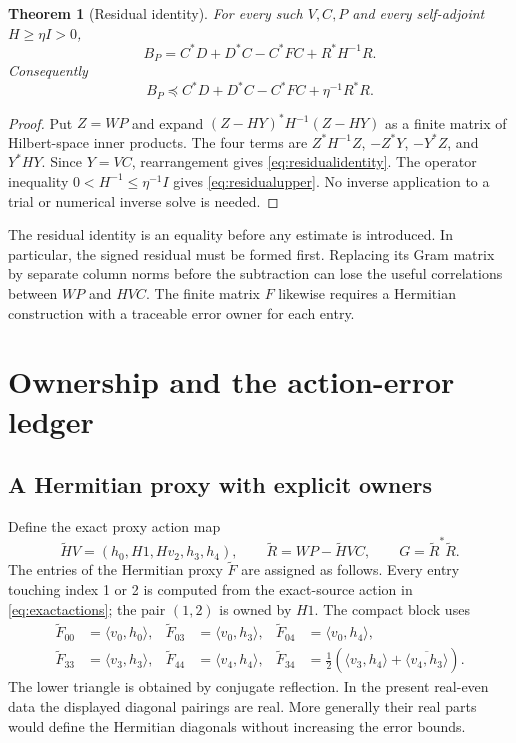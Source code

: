 \documentclass[11pt,a4paper]{article}
\numberwithin{equation}{section}
\newtheorem{theorem}{Theorem}[section]
\theoremstyle{definition}\newtheorem{definition}[theorem]{Definition}
\theoremstyle{remark}\newtheorem{remark}[theorem]{Remark}
\newcommand{\ip}[2]{\langle #1,#2\rangle}
\begin{document}
\begin{theorem}[Residual identity]\label{thm:residual}
For every such $V,C,P$ and every self-adjoint $H\ge\eta I>0$,
\begin{equation}\label{eq:residualidentity}
 B_P=C^*D+D^*C-C^*FC+R^*H^{-1}R.
\end{equation}
Consequently
\begin{equation}\label{eq:residualupper}
 B_P\preceq C^*D+D^*C-C^*FC+\eta^{-1}R^*R.
\end{equation}
\end{theorem}
\begin{proof}
Put $Z=WP$ and expand $(Z-HY)^*H^{-1}(Z-HY)$ as a finite matrix of Hilbert-space inner products. The four terms are $Z^*H^{-1}Z$, $-Z^*Y$, $-Y^*Z$, and $Y^*HY$. Since $Y=VC$, rearrangement gives \eqref{eq:residualidentity}. The operator inequality $0<H^{-1}\le\eta^{-1}I$ gives \eqref{eq:residualupper}. No inverse application to a trial or numerical inverse solve is needed.
\end{proof}

The residual identity is an equality before any estimate is introduced. In particular, the signed residual must be formed first. Replacing its Gram matrix by separate column norms before the subtraction can lose the useful correlations between $WP$ and $HVC$. The finite matrix $F$ likewise requires a Hermitian construction with a traceable error owner for each entry.

\section{Ownership and the action-error ledger}\label{sec:ledger}
\subsection{A Hermitian proxy with explicit owners}
Define the exact proxy action map
\[
 \widetilde HV=(h_0,H1,Hv_2,h_3,h_4),\qquad
 \widetilde R=WP-\widetilde HV C,\qquad G=\widetilde R^*\widetilde R.
\]
The entries of the Hermitian proxy $\widetilde F$ are assigned as follows. Every entry touching index 1 or 2 is computed from the exact-source action in \eqref{eq:exactactions}; the pair $(1,2)$ is owned by $H1$. The compact block uses
\begin{align}\label{eq:ownership}
 \widetilde F_{00}&=\ip{v_0}{h_0},&
 \widetilde F_{03}&=\ip{v_0}{h_3},&
 \widetilde F_{04}&=\ip{v_0}{h_4},\nonumber\\
 \widetilde F_{33}&=\ip{v_3}{h_3},&
 \widetilde F_{44}&=\ip{v_4}{h_4},&
 \widetilde F_{34}&=\tfrac12(\ip{v_3}{h_4}+\overline{\ip{v_4}{h_3}}).
\end{align}
The lower triangle is obtained by conjugate reflection. In the present real-even data the displayed diagonal pairings are real. More generally their real parts would define the Hermitian diagonals without increasing the error bounds.
\end{document}
